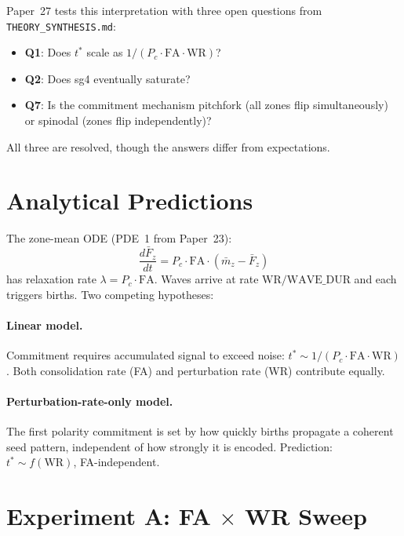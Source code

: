 \documentclass[11pt,a4paper]{article}
\begin{document}
Paper~27 tests this interpretation with three open questions from
\texttt{THEORY\_SYNTHESIS.md}:
\begin{itemize}
  \item \textbf{Q1}: Does $t^*$ scale as $1/(P_c \cdot \mathrm{FA} \cdot \mathrm{WR})$?
  \item \textbf{Q2}: Does sg4 eventually saturate?
  \item \textbf{Q7}: Is the commitment mechanism pitchfork (all zones flip
        simultaneously) or spinodal (zones flip independently)?
\end{itemize}

All three are resolved, though the answers differ from expectations.

\section{Analytical Predictions}

The zone-mean ODE (PDE~1 from Paper~23):
\begin{equation}
  \frac{d\bar{F}_z}{dt} = P_c \cdot \mathrm{FA} \cdot (\bar{m}_z - \bar{F}_z)
\end{equation}
has relaxation rate $\lambda = P_c \cdot \mathrm{FA}$.  Waves arrive at rate
$\mathrm{WR}/\mathrm{WAVE\_DUR}$ and each triggers births.  Two competing
hypotheses:

\paragraph{Linear model.}
Commitment requires accumulated signal to exceed noise:
$t^* \sim 1/(P_c \cdot \mathrm{FA} \cdot \mathrm{WR})$.
Both consolidation rate (FA) and perturbation rate (WR) contribute equally.

\paragraph{Perturbation-rate-only model.}
The first polarity commitment is set by how quickly births propagate a coherent
seed pattern, independent of how strongly it is encoded.
Prediction: $t^* \sim f(\mathrm{WR})$, FA-independent.

\section{Experiment A: FA $\times$ WR Sweep}
\end{document}
